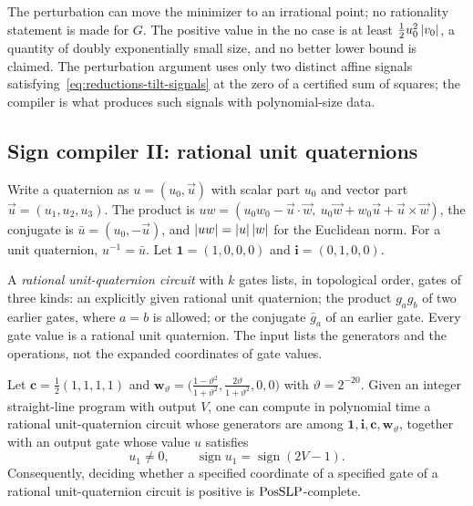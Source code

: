 The perturbation can move the minimizer to an irrational point; no rationality
statement is made for $G$. The positive value in the no case is at least
$\frac12u_0^2\left\lvert v_0\right\rvert$, a quantity of doubly exponentially small size, and no
better lower bound is claimed. The perturbation argument uses only two
distinct affine signals satisfying~\eqref{eq:reductions-tilt-signals} at the
zero of a certified sum of squares; the compiler is what produces such signals
with polynomial-size data.

\subsection{Sign compiler II: rational unit quaternions}
\label{sec:reductions-quaternion}

Write a quaternion as $u=(u_0,\vec u)$ with scalar part $u_0$ and vector part
$\vec u=(u_1,u_2,u_3)$. The product is
$uw=(u_0w_0-\vec u\cdot\vec w,\ u_0\vec w+w_0\vec u+\vec u\times\vec w)$, the
conjugate is $\bar u=(u_0,-\vec u)$, and $\left\lvert uw\right\rvert=\left\lvert u\right\rvert\left\lvert w\right\rvert$ for the
Euclidean norm. For a unit quaternion, $u^{-1}=\bar u$. Let $\mathbf1=(1,0,0,0)$
and $\mathbf i=(0,1,0,0)$.

\begin{definition}
\label{def:reductions-quaternion-circuit}
A \emph{rational unit-quaternion circuit} with $k$ gates lists, in
topological order, gates of three kinds: an explicitly given rational unit
quaternion; the product $g_ag_b$ of two earlier gates, where $a=b$ is allowed;
or the conjugate $\bar g_a$ of an earlier gate. Every gate value is a rational
unit quaternion. The input lists the generators and the operations, not the
expanded coordinates of gate values.
\end{definition}

\begin{theorem}
\label{thm:reductions-quaternion}
Let $\mathbf c=\frac12(1,1,1,1)$ and
$\mathbf w_\vartheta=\bigl(\frac{1-\vartheta^2}{1+\vartheta^2},\frac{2\vartheta}{1+\vartheta^2},0,0\bigr)$
with $\vartheta=2^{-20}$. Given an integer straight-line program with output
$V$, one can compute in polynomial time a rational unit-quaternion circuit
whose generators are among $\mathbf1,\mathbf i,\mathbf c,\mathbf w_\vartheta$,
together with an output gate whose value $u$ satisfies
\[
 u_1\ne0,\qquad \operatorname{sign}u_1=\operatorname{sign}(2V-1).
\]
Consequently, deciding whether a specified coordinate of a specified gate of a
rational unit-quaternion circuit is positive is $\mathrm{PosSLP}$-complete.
\end{theorem}

